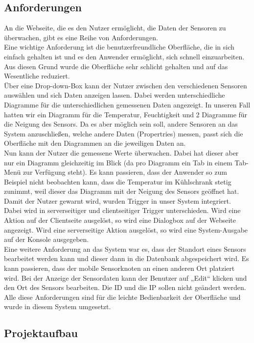\documentclass[12pt,a4paper,twoside]{article}
\begin{document}
\subsection{Anforderungen}

An die Webseite, die es den Nutzer ermöglicht, die Daten der Sensoren zu überwachen, gibt es eine Reihe von Anforderungen. \\
Eine wichtige Anforderung ist die benutzerfreundliche Oberfläche, die in sich einfach gehalten ist und es den Anwender ermöglicht, sich schnell einzuarbeiten. Aus diesen Grund wurde die Oberfläche sehr schlicht gehalten und auf das Wesentliche reduziert.\\
Über eine Drop-down-Box kann der Nutzer zwischen den verschiedenen Sensoren auswählen und sich Daten anzeigen lassen. Dabei werden unterschiedliche Diagramme für die unterschiedlichen gemessenen Daten angezeigt. In unseren Fall hatten wir ein Diagramm für die Temperatur, Feuchtigkeit und 2 Diagramme für die Neigung des Sensors. Da es aber möglich sein soll, andere Sensoren an das System anzuschließen, welche andere Daten (Propertries) messen, passt sich die Oberfläche mit den Diagrammen an die jeweiligen Daten an.\\
Nun kann der Nutzer die gemessene Werte überwachen. Dabei hat dieser aber nur ein Diagramm gleichzeitig im Blick (da pro Diagramm ein Tab in einem Tab-Menü zur Verfügung steht). Es kann passieren, dass der Anwender so zum Beispiel nicht beobachten kann, dass die Temperatur im Kühlschrank stetig zunimmt, weil dieser das Diagramm mit der Neigung des Sensors geöffnet hat. Damit der Nutzer gewarnt wird, wurden Trigger in unser System integriert. Dabei wird in serverseitiger und clientseitiger Trigger unterschieden. Wird eine Aktion auf der Clientseite ausgelöst, so wird eine Dialogbox auf der Webseite angezeigt. Wird eine serverseitige Aktion ausgelöst, so wird eine System-Ausgabe auf der Konsole ausgegeben.\\
Eine weitere Anforderung an das System war es, dass der Standort eines Sensors bearbeitet werden kann und dieser dann in die Datenbank abgespeichert wird. Es kann passieren, dass der mobile Sensorknoten an einen anderen Ort platziert wird. Bei der Anzeige der Sensordaten kann der Benutzer auf „Edit“ klicken und den Ort des Sensors bearbeiten. Die ID und die IP sollen nicht geändert werden. \\
Alle diese Anforderungen sind für die leichte Bedienbarkeit der Oberfläche und wurde in diesem System umgesetzt.

\subsection{Projektaufbau}
\end{document}
